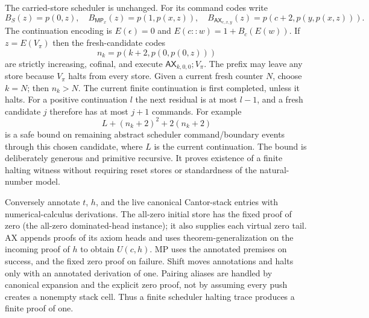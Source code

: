 The carried-store scheduler is unchanged. For its command codes write
\[
 B_S(z)=p(0,z),\quad B_{\mathsf{MP}_x}(z)=p(1,p(x,z)),\quad
 B_{\mathsf{AX}_{c,x,y}}(z)=p(c+2,p(y,p(x,z))).
\]
The continuation encoding is $E(\epsilon)=0$ and
$E(c::w)=1+B_c(E(w))$. If $z=E(V_\pi)$ then the fresh-candidate codes
\[
 n_k=p(k+2,p(0,p(0,z)))
\]
are strictly increasing, cofinal, and execute
$\mathsf{AX}_{k,0,0};V_\pi$. The prefix may leave any store because
$V_\pi$ halts from every store. Given a current fresh counter $N$, choose
$k=N$; then $n_k>N$. The current finite continuation is first completed,
unless it halts. For a positive continuation $l$ the next residual is at
most $l-1$, and a fresh candidate $j$ therefore has at most $j+1$ commands.
For example
\[
 L+(n_k+2)^2+2(n_k+2)
\]
is a safe bound on remaining abstract scheduler command/boundary events
through this chosen candidate, where $L$ is the current continuation.
The bound is deliberately generous and primitive recursive. It proves
existence of a finite halting witness without requiring reset stores or
standardness of the natural-number model.

Conversely annotate $t$, $h$, and the live canonical Cantor-stack entries
with numerical-calculus derivations. The all-zero initial store has the
fixed proof of zero (the all-zero dominated-head instance); it also
supplies each virtual zero tail. AX appends proofs of its axiom heads and
uses theorem-generalization on the incoming proof of $h$ to obtain
$U(c,h)$. MP uses the annotated premises on success, and the fixed zero
proof on failure. Shift moves annotations and halts only with an
annotated derivation of one. Pairing aliases are handled by canonical
expansion and the explicit zero proof, not by assuming every push creates
a nonempty stack cell. Thus a finite scheduler halting trace produces a
finite proof of one.

